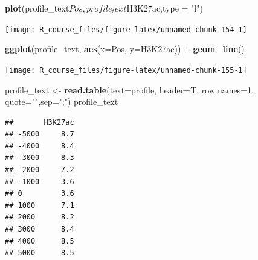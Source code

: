 \documentclass[]{article}
\newenvironment{Shaded}{\begin{snugshade}}{\end{snugshade}}
\newcommand{\KeywordTok}[1]{\textcolor[rgb]{0.13,0.29,0.53}{\textbf{{#1}}}}
\newcommand{\DataTypeTok}[1]{\textcolor[rgb]{0.13,0.29,0.53}{{#1}}}
\newcommand{\DecValTok}[1]{\textcolor[rgb]{0.00,0.00,0.81}{{#1}}}
\newcommand{\StringTok}[1]{\textcolor[rgb]{0.31,0.60,0.02}{{#1}}}
\newcommand{\CommentTok}[1]{\textcolor[rgb]{0.56,0.35,0.01}{\textit{{#1}}}}
\newcommand{\NormalTok}[1]{{#1}}
\numberwithin{figure}{section}
\numberwithin{table}{section}
\theoremstyle{definition}
\theoremstyle{definition}
\theoremstyle{definition}
\theoremstyle{remark}
\begin{document}
\begin{Shaded}
\begin{Highlighting}[]
\KeywordTok{plot}\NormalTok{(profile_text$Pos, profile_text$H3K27ac,}\DataTypeTok{type =} \StringTok{"l"}\NormalTok{)}
\end{Highlighting}
\end{Shaded}

\begin{center}\texttt{[image: R\_course\_files/figure-latex/unnamed-chunk-154-1]} \end{center}

\begin{Shaded}
\begin{Highlighting}[]
\KeywordTok{ggplot}\NormalTok{(profile_text, }\KeywordTok{aes}\NormalTok{(}\DataTypeTok{x=}\NormalTok{Pos, }\DataTypeTok{y=}\NormalTok{H3K27ac)) +}\StringTok{ }\KeywordTok{geom_line}\NormalTok{()}
\end{Highlighting}
\end{Shaded}

\begin{center}\texttt{[image: R\_course\_files/figure-latex/unnamed-chunk-155-1]} \end{center}

\begin{Shaded}
\begin{Highlighting}[]
\NormalTok{profile_text <-}\StringTok{ }\KeywordTok{read.table}\NormalTok{(}\DataTypeTok{text=}\NormalTok{profile, }\DataTypeTok{header=}\NormalTok{T, }\DataTypeTok{row.names=}\DecValTok{1}\NormalTok{, }\DataTypeTok{quote=}\StringTok{""}\NormalTok{,}\DataTypeTok{sep=}\StringTok{";"}\NormalTok{)}
\NormalTok{profile_text}
\end{Highlighting}
\end{Shaded}

\begin{verbatim}
##       H3K27ac
## -5000     8.7
## -4000     8.4
## -3000     8.3
## -2000     7.2
## -1000     3.6
## 0         3.6
## 1000      7.1
## 2000      8.2
## 3000      8.4
## 4000      8.5
## 5000      8.5
\end{verbatim}

\begin{Shaded}
\end{Shaded}
\end{document}
